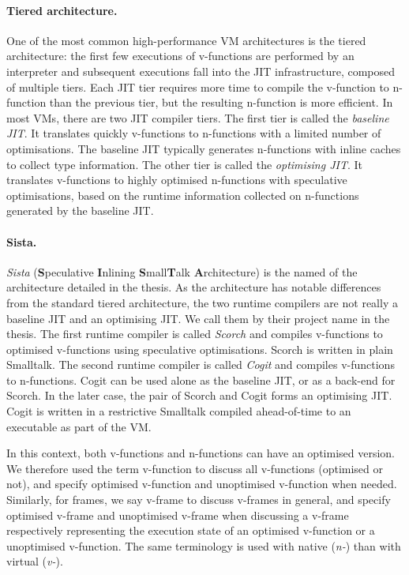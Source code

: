 \documentclass[a4paper,12pt,twoside]{../includes/ThesisStyle}
\begin{document}
\paragraph{Tiered architecture.} One of the most common high-performance VM architectures is the tiered architecture: the first few executions of v-functions are performed by an interpreter and subsequent executions fall into the JIT infrastructure, composed of multiple tiers. Each JIT tier requires more time to compile the v-function to n-function than the previous tier, but the resulting n-function is more efficient. In most VMs, there are two JIT compiler tiers. The first tier is called the \emph{baseline JIT}. It translates quickly v-functions to n-functions with a limited number of optimisations. The baseline JIT typically generates n-functions with inline caches to collect type information. The other tier is called the \emph{optimising JIT}. It translates v-functions to highly optimised n-functions with speculative optimisations, based on the runtime information collected on n-functions generated by the baseline JIT.

\paragraph{Sista.} \emph{Sista} (\textbf{S}peculative \textbf{I}nlining \textbf{S}mall\textbf{T}alk \textbf{A}rchitecture) is the named of the architecture detailed in the thesis. As the architecture has notable differences from the standard tiered architecture, the two runtime compilers are not really a baseline JIT and an optimising JIT. We call them by their project name in the thesis. The first runtime compiler is called \emph{Scorch} and compiles v-functions to optimised v-functions using speculative optimisations. Scorch is written in plain Smalltalk. The second runtime compiler is called \emph{Cogit} and compiles v-functions to n-functions. Cogit can be used alone as the baseline JIT, or as a back-end for Scorch. In the later case, the pair of Scorch and Cogit forms an optimising JIT. Cogit is written in a restrictive Smalltalk compiled ahead-of-time to an executable as part of the VM.

In this context, both v-functions and n-functions can have an optimised version. We therefore used the term v-function to discuss all v-functions (optimised or not), and specify optimised v-function and unoptimised v-function when needed. Similarly, for frames, we say v-frame to discuss v-frames in general, and specify optimised v-frame and unoptimised v-frame when discussing a v-frame respectively representing the execution state of an optimised v-function or a unoptimised v-function. The same terminology is used with native (\emph{n-}) than with virtual (\emph{v-}).
\end{document}

